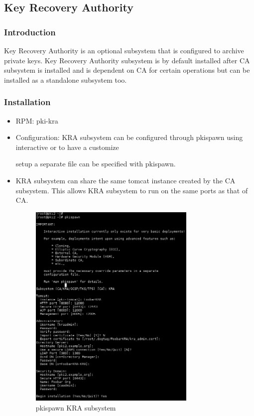 \documentclass[a4paper]{article}
\begin{document}
\subsection{Key Recovery Authority}
\subsubsection{Introduction}
Key Recovery Authority is an optional subsystem that is configured to archive private keys. Key Recovery Authority
subsystem is by default installed after CA subsystem is installed and is dependent on CA for certain operations
but can be installed as a standalone subsystem too.
\subsubsection{Installation}
\begin{itemize}
    \item RPM: pki-kra
    \item Configuration: KRA subsystem can be configured through pkispawn using interactive or to have a customize

        setup a separate file can be specified with pkispawn.

    \item KRA subsystem can share the same tomcat instance created by the CA subsystem. This allows KRA subsystem
        to run on the same ports as that of CA.

        \begin{figure}[H]
            \centering
            \includegraphics[width=80mm]{pkispawn-kra.png}
            \caption{pkispawn KRA subsystem}
        \end{figure}
\end{itemize}
\end{document}
